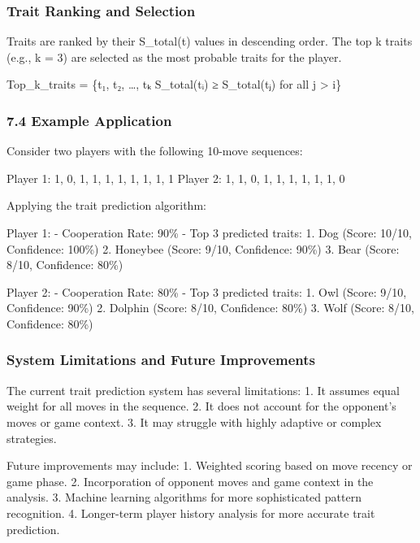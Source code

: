 \documentclass[]{article}
\begin{document}
\hypertarget{trait-ranking-and-selection}{%
\subsubsection{Trait Ranking and
Selection}\label{trait-ranking-and-selection}}

Traits are ranked by their S\_total(t) values in descending order. The
top k traits (e.g., k = 3) are selected as the most probable traits for
the player.

Top\_k\_traits = \{t₁, t₂, \ldots, tₖ \textbar{} S\_total(tᵢ) ≥
S\_total(tⱼ) for all j \textgreater{} i\}

\hypertarget{example-application}{%
\subsubsection{7.4 Example Application}\label{example-application}}

Consider two players with the following 10-move sequences:

Player 1: 1, 0, 1, 1, 1, 1, 1, 1, 1, 1 Player 2: 1, 1, 0, 1, 1, 1, 1, 1,
1, 0

Applying the trait prediction algorithm:

Player 1: - Cooperation Rate: 90\% - Top 3 predicted traits: 1. Dog
(Score: 10/10, Confidence: 100\%) 2. Honeybee (Score: 9/10, Confidence:
90\%) 3. Bear (Score: 8/10, Confidence: 80\%)

Player 2: - Cooperation Rate: 80\% - Top 3 predicted traits: 1. Owl
(Score: 9/10, Confidence: 90\%) 2. Dolphin (Score: 8/10, Confidence:
80\%) 3. Wolf (Score: 8/10, Confidence: 80\%)

\hypertarget{system-limitations-and-future-improvements}{%
\subsubsection{System Limitations and Future
Improvements}\label{system-limitations-and-future-improvements}}

The current trait prediction system has several limitations: 1. It
assumes equal weight for all moves in the sequence. 2. It does not
account for the opponent's moves or game context. 3. It may struggle
with highly adaptive or complex strategies.

Future improvements may include: 1. Weighted scoring based on move
recency or game phase. 2. Incorporation of opponent moves and game
context in the analysis. 3. Machine learning algorithms for more
sophisticated pattern recognition. 4. Longer-term player history
analysis for more accurate trait prediction.
\end{document}
